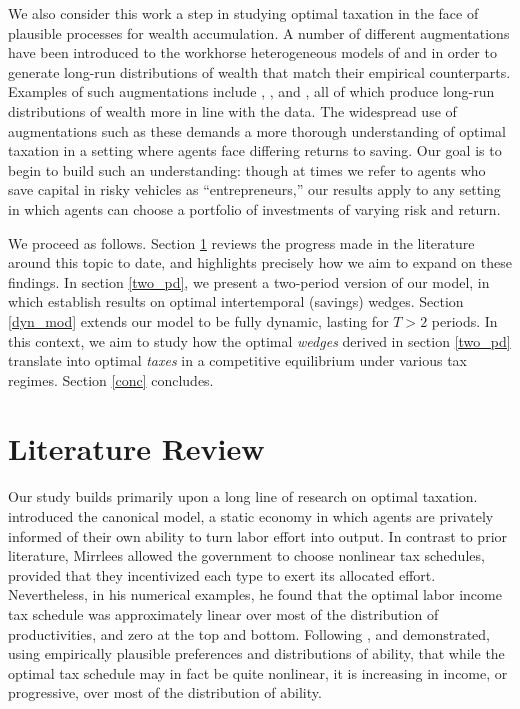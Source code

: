 \documentclass[11pt]{article}
\begin{document}
We also consider this work a step in studying optimal taxation in the face of plausible processes for wealth accumulation. A number of different augmentations have been introduced to the workhorse heterogeneous models of \cite{aiyagari1994uninsured} and \cite{huggett1996wealth} in order to generate long-run distributions of wealth that match their empirical counterparts. Examples of such augmentations include \cite{quadrini2000entrepreneurship}, \cite{hubmer2016historical}, and \cite{benhabib2019wealth}, all of which produce long-run distributions of wealth more in line with the data. The widespread use of augmentations such as these demands a more thorough understanding of optimal taxation in a setting where agents face differing returns to saving. Our goal is to begin to build such an understanding: though at times we refer to agents who save capital in risky vehicles as ``entrepreneurs,'' our results apply to any setting in which agents can choose a portfolio of investments of varying risk and return. 

We proceed as follows. Section \ref{lit_rev} reviews the progress made in the literature around this topic to date, and highlights precisely how we aim to expand on these findings. In section \ref{two_pd}, we present a two-period version of our model, in which establish results on optimal intertemporal (savings) wedges. Section \ref{dyn_mod} extends our model to be fully dynamic, lasting for \( T > 2 \) periods. In this context, we aim to study how the optimal \textit{wedges} derived in section \ref{two_pd} translate into optimal \textit{taxes} in a competitive equilibrium under various tax regimes. Section \ref{conc} concludes. 

\section{Literature Review} \label{lit_rev}

Our study builds primarily upon a long line of research on optimal taxation. \cite{mirrlees1971exploration} introduced the canonical model, a static economy in which agents are privately informed of their own ability to turn labor effort into output. In contrast to prior literature, Mirrlees allowed the government to choose nonlinear tax schedules, provided that they incentivized each type to exert its allocated effort. Nevertheless, in his numerical examples, he found that the optimal labor income tax schedule was approximately linear over most of the distribution of productivities, and zero at the top and bottom. Following \cite{mirrlees1971exploration}, \cite{diamond1998optimal} and \cite{saez2001using} demonstrated, using empirically plausible preferences and distributions of ability, that while the optimal tax schedule may in fact be quite nonlinear, it is increasing in income, or progressive, over most of the distribution of ability.
\end{document}
